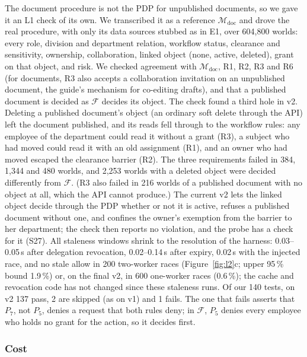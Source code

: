 The document procedure is not the PDP for unpublished documents, so we gave it an L1 check of its own. We
transcribed it as a reference $\mathcal{M}_{\mathrm{doc}}$ and drove the real procedure, with only its data
sources stubbed as in E1, over 604{,}800 worlds: every role, division and department relation, workflow status,
clearance and sensitivity, ownership, collaboration, linked object (none, active, deleted), grant on that object,
and risk. We checked agreement with $\mathcal{M}_{\mathrm{doc}}$, R1, R2, R3 and R6 (for documents, R3 also accepts
a collaboration invitation on an unpublished document, the guide's mechanism for co-editing drafts), and that a
published document is decided as $\mathcal{F}$ decides its object. The check found a third hole in v2. Deleting a
published document's object (an ordinary soft delete through the API) left the document published, and its reads
fell through to the workflow rules: any employee of the department could read it without a grant (R3), a subject
who had moved could read it with an old assignment (R1), and an owner who had moved escaped the clearance barrier
(R2). The three requirements failed in 384, 1{,}344 and 480 worlds, and 2{,}253 worlds with a deleted object were
decided differently from $\mathcal{F}$. (R3 also failed in 216 worlds of a published document with no object at
all, which the API cannot produce.) The current v2 lets the linked object decide through the PDP whether or not it is
active, refuses a published document without one, and confines the owner's exemption from the barrier to her
department; the check then reports no violation, and the probe has a check for it (S27). All staleness windows shrink to the
resolution of the harness: 0.03--0.05\,s after delegation revocation, 0.02--0.14\,s after expiry, 0.02\,s with the
injected race, and no stale allow in 200 two-worker races (Figure~\ref{fig:l2}c; upper 95\,\% bound 1.9\,\%) or,
on the final v2, in 600 one-worker races (0.6\,\%); the cache and revocation code has not changed since these staleness runs. Of our 140 tests, on v2
137 pass, 2 are skipped (as on v1) and 1 fails. The one that fails asserts that $P_7$, not $P_5$, denies a request
that both rules deny; in $\mathcal{F}$, $P_5$ denies every employee who holds no grant for the action, so it
decides first.

\subsubsection{Cost}

